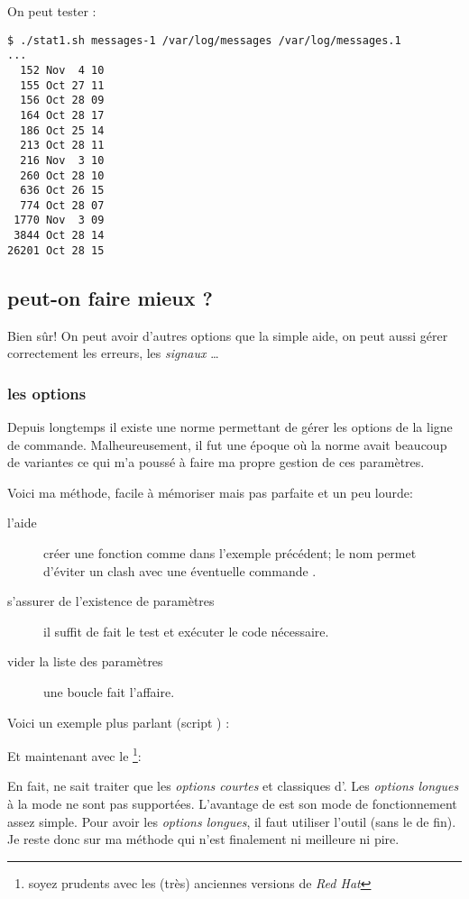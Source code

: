 On peut tester :

\begin{lstlisting}
$ ./stat1.sh messages-1 /var/log/messages /var/log/messages.1
...
  152 Nov  4 10
  155 Oct 27 11
  156 Oct 28 09
  164 Oct 28 17
  186 Oct 25 14
  213 Oct 28 11
  216 Nov  3 10
  260 Oct 28 10
  636 Oct 26 15
  774 Oct 28 07
 1770 Nov  3 09
 3844 Oct 28 14
26201 Oct 28 15
\end{lstlisting}

\subsection{peut-on faire mieux ?}
Bien sûr! On peut avoir d'autres options que la simple aide, on peut aussi gérer correctement les erreurs, les \emph{signaux \unix}\ldots

\subsubsection{les options}
Depuis longtemps il existe une norme \POSIX permettant de gérer les options de la ligne
de commande. Malheureusement, il fut une époque où la norme avait beaucoup de variantes
ce qui m'a poussé à faire ma propre gestion de ces paramètres.

Voici ma méthode, facile à mémoriser mais pas parfaite et un peu lourde:

\begin{description}
    \item[l'aide] créer une fonction  comme dans l'exemple précédent;
    le nom  permet d'éviter un clash avec une éventuelle commande .
    \item[s'assurer de l'existence de paramètres] il suffit de fait le test \code{[ \$\# -eq 0 ]} et
    exécuter le code nécessaire.
    \item[vider la liste des paramètres] une boucle  fait l'affaire.
\end{description}

Voici un exemple plus parlant (script ) :


Et maintenant avec le \footnote{soyez prudents avec les (très) anciennes versions de \emph{Red Hat}}:


En fait,  ne sait traiter que les \emph{options courtes} et classiques d'\unix. Les \emph{options longues}
à la mode \linux ne sont pas supportées. L'avantage de  est son mode de fonctionnement
assez simple. Pour avoir les \emph{options longues}, il faut utiliser l'outil \GNU {} (sans le  de fin).
Je reste donc sur ma méthode qui n'est finalement ni meilleure ni pire.
